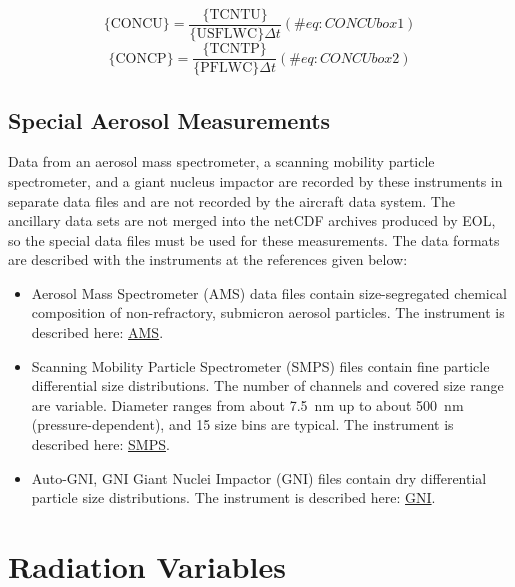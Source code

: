 \documentclass[
  english,
]{book}
\providecommand{\tightlist}{%
  \setlength{\itemsep}{0pt}\setlength{\parskip}{0pt}}
\begin{document}
\begin{equation}
\mathrm{\{CONCU\}}=\frac{\mathrm{\{TCNTU\}}}{\mathrm{\{USFLWC\}}\Delta t}
(\#eq:CONCUbox1)
\end{equation} \begin{equation}
\mathrm{\{CONCP\}}=\frac{\mathrm{\{TCNTP\}}}{\mathrm{\{PFLWC\}}\Delta t}
(\#eq:CONCUbox2)
\end{equation}

\hypertarget{special-aerosol}{%
\section{Special Aerosol Measurements}\label{special-aerosol}}

Data from an aerosol mass spectrometer, a scanning mobility particle
spectrometer, and a giant nucleus impactor are recorded by these
instruments in separate data files and are not recorded by the aircraft
data system. The ancillary data sets are not merged into the netCDF
archives produced by EOL, so the special data files must be used for
these measurements. The data formats are described with the instruments
at the references given below:

\begin{itemize}
\tightlist
\item
  Aerosol Mass Spectrometer (AMS) data files contain size-segregated
  chemical composition of non-refractory, submicron aerosol particles.
  The instrument is described here:
  \href{https://www.eol.ucar.edu/instruments/time-flight-aerosol-mass-spectrometer}{AMS}.\\
\item
  Scanning Mobility Particle Spectrometer (SMPS) files contain fine
  particle differential size distributions. The number of channels and
  covered size range are variable. Diameter ranges from about 7.5~nm up
  to about 500~nm (pressure-dependent), and 15 size bins are typical.
  The instrument is described here:
  \href{https://www.eol.ucar.edu/instruments/scanning-mobility-particle-spectrometer}{SMPS}.\\
\item
  Auto-GNI, GNI Giant Nuclei Impactor (GNI) files contain dry
  differential particle size distributions. The instrument is described
  here:
  \href{https://www.eol.ucar.edu/instruments/giant-nuclei-impactor}{GNI}.
\end{itemize}

\hypertarget{radiation-variables}{%
\chapter{Radiation Variables}\label{radiation-variables}}
\end{document}
